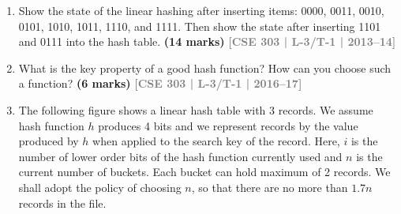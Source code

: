 \documentclass[12pt,a3paper]{article}
\newcommand{\yr}[1]{\hfill\textcolor{gray}{\small\textbf{[#1]}}}
\newcommand{\mk}[1]{\textcolor{orange!70!black}{\small\textbf{(#1 marks)}}}
\begin{document}
\begin{enumerate}
\mk{15} \yr{CSE 303 | L-3/T-1 | 2014--15}

\item Show the state of the linear hashing after inserting items: 0000, 0011, 0010, 0101, 1010, 1011, 1110, and 1111. Then show the state after inserting 1101 and 0111 into the hash table.
\mk{14} \yr{CSE 303 | L-3/T-1 | 2013--14}

\item What is the key property of a good hash function? How can you choose such a function?
\mk{6} \yr{CSE 303 | L-3/T-1 | 2016--17}

\item The following figure shows a linear hash table with 3 records. We assume hash function $h$ produces 4 bits and we represent records by the value produced by $h$ when applied to the search key of the record. Here, $i$ is the number of lower order bits of the hash function currently used and $n$ is the current number of buckets. Each bucket can hold maximum of 2 records. We shall adopt the policy of choosing $n$, so that there are no more than $1.7 n$ records in the file.

\vspace{0.6cm}

\begin{center}
\end{center}
\end{enumerate}
\end{document}
